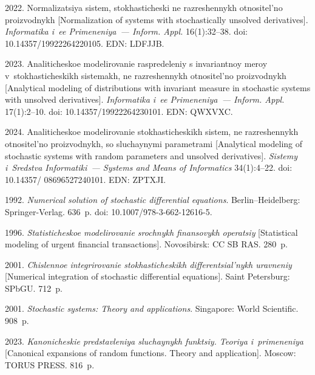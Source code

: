 \begin{multicols}{2}
{{\begin{thebibliography}{99}
 2022.
Normalizatsiya sistem, sto\-kha\-sti\-che\-ski ne razreshennykh otnositel'no proizvodnykh [Normalization of systems with stochastically unsolved derivatives]. 
\textit{Informatika i~ee Primeneniya~--- Inform. Appl.} 16(1):32--38.
doi: 10.14357/19922264220105. EDN: LDFJJB.

 2023. 
Analiticheskoe modelirovanie raspredeleniy s invariantnoy meroy v~stokhasticheskikh sistemakh, ne razreshennykh otnositel'no proizvodnykh 
[Analytical modeling of distributions with invariant measure in stochastic systems with unsolved derivatives]. 
\textit{Informatika i~ee Primeneniya~--- Inform. Appl.}  17(1):2--10. doi: 10.14357/19922264230101. EDN: QWXVXC.

 2024. 
Analiticheskoe modelirovanie sto\-kha\-sti\-che\-skikh  sistem, ne razreshennykh otnositel'no pro\-iz\-vod\-nykh, so sluchaynymi parametrami 
[Analytical modeling of stochastic systems with random parameters and unsolved derivatives]. 
\textit{Sistemy i~Sredstva Informatiki~--- Systems and Means of Informatics} 34(1):4--22. 
doi: 10.14357/ 08696527240101. EDN: ZPTXJI.

 1992. 
\textit{Numerical solution of stochastic differential equations}. Berlin--Heidelberg: Springer-Verlag. 636~p.
doi: 10.1007/978-3-662-12616-5.

 1996. 
\textit{Statisticheskoe modelirovanie srochnykh finansovykh operatsiy} [Statistical modeling of urgent financial transactions]. 
Novosibirsk: CC SB RAS. 280~p.

 2001.
\textit{Chislennoe integrirovanie sto\-kha\-sti\-che\-skikh differentsial'nykh uravneniy} [Numerical integration of stochastic differential equations]. 
Saint Petersburg: SPbGU. 712~p.

 2001.
\textit{Stochastic systems: Theory and applications}. Singapore: World Scientific. 908~p.

 2023.
\textit{Kanonicheskie predstavleniya sluchaynykh funktsiy. Teoriya i~primeneniya} [Canonical expansions of random functions. Theory and application]. 
Moscow: TORUS PRESS. 816~p.



\end{thebibliography}

 }
 }

\end{multicols}

